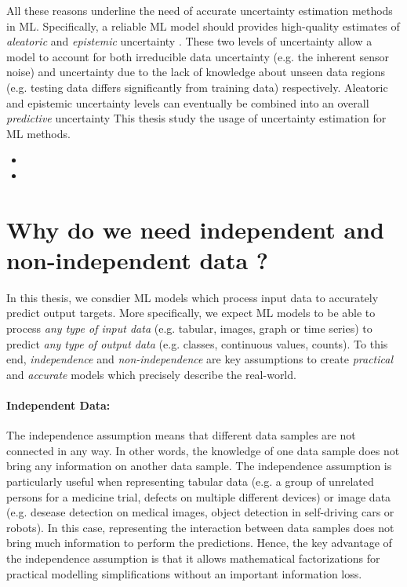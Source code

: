 All these reasons underline the need of accurate uncertainty estimation methods in ML. 
Specifically, a reliable ML model should provides high-quality estimates of \emph{aleatoric} and \emph{epistemic} uncertainty \citep{Gal2016a}.
These two levels of uncertainty allow a model to account for both irreducible data uncertainty (e.g. the inherent sensor noise) and uncertainty due to the lack of knowledge about unseen data regions (e.g. testing data differs significantly from training data) respectively.
Aleatoric and epistemic uncertainty levels can eventually be combined into an overall \emph{predictive} uncertainty \citep{Gal2016a}
This thesis study the usage of uncertainty estimation for ML methods.

\begin{itemize}
    \item {}
    \item {}
\end{itemize}

\section{Why do we need independent and non-independent data ?}

In this thesis, we consdier ML models which process input data to accurately predict output targets. 
More specifically, we expect ML models to be able to process \emph{any type of input data} (e.g. tabular, images, graph or time series) to predict \emph{any type of output data} (e.g. classes, continuous values, counts).
To this end, \emph{independence} and \emph{non-independence} are key assumptions to create \emph{practical} and \emph{accurate} models which precisely describe the real-world. 

\paragraph*{Independent Data:} The independence assumption means that different data samples are not connected in any way. In other words, the knowledge of one data sample does not bring any information on another data sample.
The independence assumption is particularly useful when representing tabular data (e.g. a group of unrelated persons for a medicine trial, defects on multiple different devices) or image data (e.g. desease detection on medical images, object detection in self-driving cars or robots).
In this case, representing the interaction between data samples does not bring much information to perform the predictions.
Hence, the key advantage of the independence assumption is that it allows mathematical factorizations for practical modelling simplifications \citep{bishop} without an important information loss.

